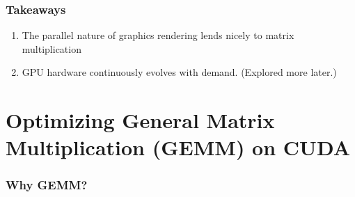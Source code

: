 \documentclass{beamer}
\begin{document}
\begin{frame}

\end{frame}

\begin{frame}
  \frametitle{Takeaways}
  \begin{enumerate}
    \item The parallel nature of graphics rendering lends nicely to matrix multiplication
    \item GPU hardware continuously evolves with demand. (Explored more later.)
  \end{enumerate}
\end{frame}

\section{Optimizing \textbf{Ge}neral \textbf{M}atrix \textbf{M}ultiplication (GEMM) on CUDA}
\begin{frame}
  \frametitle{Why GEMM?}
\end{frame}
\end{document}
